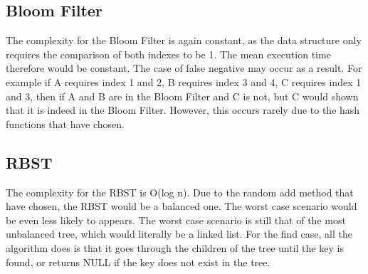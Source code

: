 \documentclass[11pt]{article}
\begin{document}
\subsection*{Bloom Filter}
The complexity for the Bloom Filter is again constant, as the data structure  only requires the comparison of both indexes to be 1. The mean execution time therefore would be constant. The case of false negative may occur as a result. For example if A requires index 1 and 2, B requires index 3 and 4, C requires index 1 and 3,  then if A and B are in the Bloom Filter and C is not, but C would shown that it is indeed in the Bloom Filter. However, this occurs rarely due to the hash functions that have chosen. 
\subsection*{RBST}
The complexity for the RBST is O(log n). Due to the random add method that have chosen, the RBST would be a balanced one. The worst case scenario would be even less likely to appears. The worst case scenario is still that of the most unbalanced tree, which would literally be a linked list. For the find case, all the algorithm does is that it goes through the children of the tree until the key is found, or returns NULL if the key does not exist in the tree. \\
\end{document}
